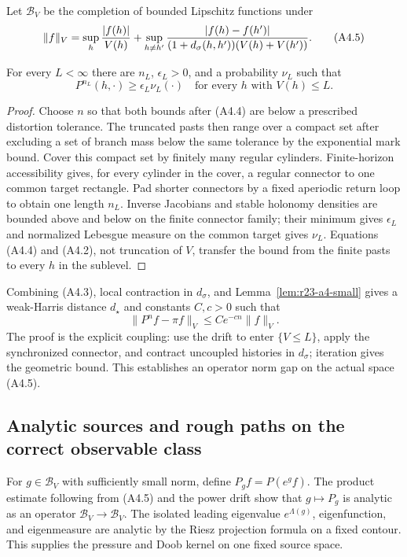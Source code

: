 Let $\mathcal B_V$ be the completion of bounded Lipschitz functions under
\[
 \|f\|_V=\sup_h{|f(h)|\over V(h)}+
 \sup_{h\ne h'}{|f(h)-f(h')|\over
 (1+d_\sigma(h,h'))(V(h)+V(h'))}.                         \tag{A4.5}
\]

\begin{lemma}
\label{lem:r23-a4-small}
For every $L<\infty$ there are $n_L$, $\epsilon_L>0$, and a probability
$\nu_L$ such that
\[
 P^{n_L}(h,\cdot)\ge\epsilon_L\nu_L(\cdot)
 \quad\text{for every }h\text{ with }V(h)\le L.          \tag{A4.6}
\]
\end{lemma}

\begin{proof}
Choose $n$ so that both bounds after (A4.4) are below a prescribed distortion
tolerance.  The truncated pasts then range over a compact set after excluding
a set of branch mass below the same tolerance by the exponential mark bound.
Cover this compact set by finitely many regular cylinders.  Finite-horizon
accessibility gives, for every cylinder in the cover, a regular connector to
one common target rectangle.  Pad shorter connectors by a fixed aperiodic
return loop to obtain one length $n_L$.  Inverse Jacobians and stable holonomy
densities are bounded above and below on the finite connector family; their
minimum gives $\epsilon_L$ and normalized Lebesgue measure on the common
target gives $\nu_L$.  Equations (A4.4) and (A4.2), not truncation of $V$,
transfer the bound from the finite pasts to every $h$ in the sublevel.
\end{proof}

Combining (A4.3), local contraction in $d_\sigma$, and
Lemma~\ref{lem:r23-a4-small} gives a weak-Harris distance $d_\star$ and
constants $C,c>0$ such that
\[
 \|P^nf-\pi f\|_V\le Ce^{-cn}\|f\|_V.                  \tag{A4.7}
\]
The proof is the explicit coupling: use the drift to enter $\{V\le L\}$,
apply the synchronized connector, and contract uncoupled histories in
$d_\sigma$; iteration gives the geometric bound.  This establishes an
operator norm gap on the actual space (A4.5).

\subsection{Analytic sources and rough paths on the correct observable class}

For $g\in\mathcal B_V$ with sufficiently small norm, define
$P_gf=P(e^g f)$.  The product estimate following from (A4.5) and the power
drift show that $g\mapsto P_g$ is analytic as an operator
$\mathcal B_V\to\mathcal B_V$.  The isolated leading eigenvalue
$e^{\Lambda(g)}$, eigenfunction, and eigenmeasure are analytic by the Riesz
projection formula on a fixed contour.  This supplies the pressure and Doob
kernel on one fixed source space.

